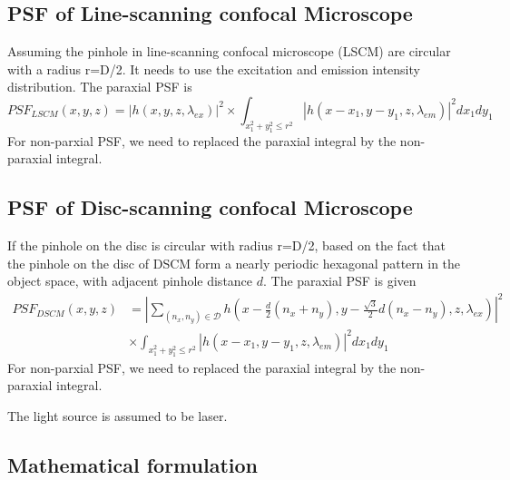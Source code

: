 \subsection{PSF of Line-scanning confocal Microscope}

Assuming the pinhole in line-scanning confocal microscope (LSCM) are circular
with a radius r=D/2. It needs to use the excitation and emission intensity
distribution. The paraxial PSF is
\begin{equation}
PSF_{LSCM} (x,y,z) = |h(x,y,z,\lambda_{ex})|^2 \times
 \int_{x_1^2+y_1^2\le r^2} |h(x-x_1,y-y_1,z,\lambda_{em})|^2dx_1dy_1
\end{equation}
For non-parxial PSF, we need to replaced the paraxial integral by the
non-paraxial integral.



\subsection{PSF of Disc-scanning confocal Microscope}

If the pinhole on the disc is circular with radius r=D/2, based on the fact that
the pinhole on the disc of DSCM form a nearly periodic hexagonal pattern in the
object space, with adjacent pinhole distance $d$. The paraxial PSF is given 
\begin{equation}
\begin{split}
PSF_{DSCM} (x,y,z) &= |\sum_{(n_x,n_y) \in
\mathcal{D}}h(x-\frac{d}{2}(n_x+n_y),y-\frac{\sqrt{3}}{2}d(n_x-n_y),z,\lambda_{ex})|^2
\\
&\times \int_{x_1^2+y_1^2\le r^2} |h(x-x_1,y-y_1,z,\lambda_{em})|^2dx_1dy_1
\end{split}
\end{equation}
For non-parxial PSF, we need to replaced the paraxial integral by the
non-paraxial integral.

The light source is assumed to be laser.


\subsection{Mathematical formulation}
\label{sec:math_formulation_PSF}


